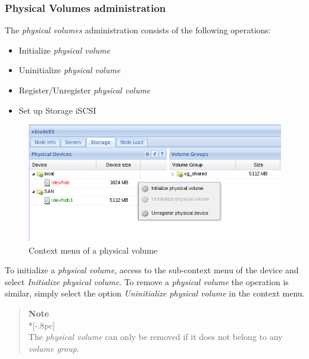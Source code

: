 
\subsubsection{Physical Volumes administration}
The \emph{physical volumes} administration consists of the following operations:
\begin{itemize}
	\item Initialize \emph{physical volume}
    \item Uninitialize \emph{physical volume}
    \item Register/Unregister \emph{physical volume}
    \item Set up Storage iSCSI
\end{itemize}

\begin{figure}[H]
        \begin{center}
        \includegraphics[scale=0.45]{screenshots/node_storage_device_ctx.png}
        \caption{Context menu of a physical volume}
        \label{fig:storage_device_ctx}
        \end{center}
\end{figure}

To initialize a \emph{physical volume}, access to the sub-context menu of the device and select \emph{Initialize physical volume}. To remove a \emph{physical volume} the operation is similar, simply select the option \emph{Uninitialize physical volume} in the context menu.

\begin{quote}
	{\large \bf Note} \\*[-.8pc]
	\underline{\hspace{6in}} \\
    The \emph{physical volume} can only be removed if it does not belong to any \emph{volume group}.
\end{quote}

